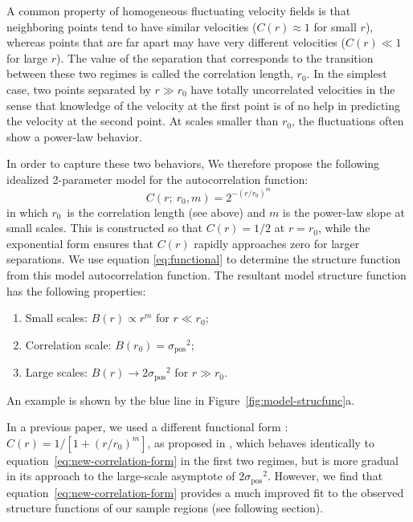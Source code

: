 \documentclass[fleqn,usenatbib, useAMS, a4paper]{mnras}
\newcommand\pos{\ensuremath{_{\mathrm{pos}}}}
\begin{document}
A common property of homogeneous fluctuating velocity fields is that neighboring points tend to have similar velocities
(\(C(r) \approx 1\) for small \(r\)),
whereas points that are far apart may have very different velocities
(\(C(r) \ll 1\) for large \(r\)).
The value of the separation that corresponds to
the transition between these two regimes
is called the correlation length, \(r_0\).
In the simplest case,
two points separated by \(r \gg r_0\) have totally uncorrelated velocities
in the sense that knowledge of the velocity at the first point is of
no help in predicting the velocity at the second point.
At scales smaller than \(r_0\), the fluctuations often show a power-law behavior.

In order to capture these two behaviors,
We therefore propose the following idealized 2-parameter model
for the autocorrelation function:
%
\begin{equation}\label{eq:new-correlation-form}
  C(r;\ r_0, m) = 2^{- \left( r/r_0 \right)^m} 
\end{equation}
%
in which \(r_{0}\)\ is the correlation length (see above)
and \(m\) is the power-law slope at small scales.
This is constructed so that \(C(r) = 1/2\) at \(r = r_0\),
while the exponential form ensures that \(C(r)\) rapidly approaches zero
for larger separations.
We use equation \eqref{eq:functional} to determine the structure function
from this model autocorrelation function.
The resultant model structure function has the following properties:
\begin{enumerate}[1.]
 \item Small scales: \(B(r) \propto r^m\) for \(r \ll r_0\);
 \item Correlation scale: \(B(r_0) = \sigma\pos^2\);
 \item Large scales: \(B(r) \to 2 \sigma\pos^2\) for \(r \gg r_0\).
 \end{enumerate}
An example is shown by the blue line in Figure~\ref{fig:model-strucfunc}a.
 
In a previous paper, we used a different functional form
\citetext{See Fig.~13 of \citealp{arthur2016turbulence}}:
\(C(r) = 1/[1+(r/r_{0})^{m}]\), as proposed in \citet{1984ApJ...277..556S},
which behaves identically to equation~\eqref{eq:new-correlation-form}
in the first two regimes, but is more gradual in its approach
to the large-scale asymptote of \(2 \sigma\pos^2\).
However, we find that equation~\eqref{eq:new-correlation-form}
provides a much improved fit to the observed structure functions
of our sample regions (see following section). 
\end{document}
